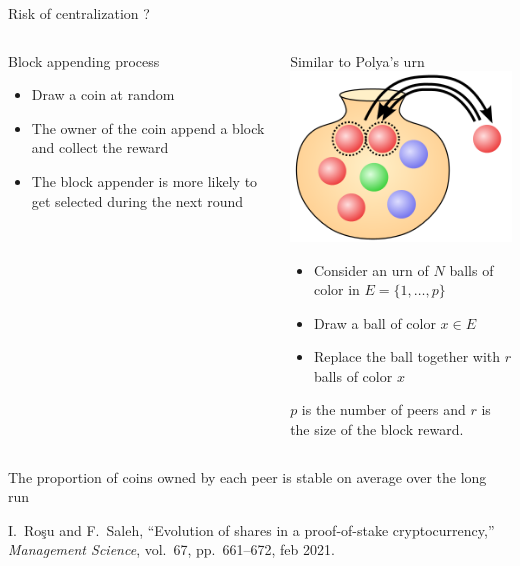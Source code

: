 \documentclass{beamer}
\begin{document}
\begin{frame}{Risk of centralization ?}
\scriptsize
\begin{columns}
\begin{column}{0.5\textwidth}
Block appending process
\begin{itemize}
  \item Draw a coin at random
  \item The owner of the coin append a block and collect the reward
  \item The block appender is more likely to get selected during the next round
\end{itemize}
\end{column}
\begin{column}{0.5\textwidth}
Similar to Polya's urn \includegraphics[scale=0.1]{../../Figures/poly_urn.png}
\begin{itemize}
  \item Consider an urn of $N$ balls of color in $E=\{1,\ldots, p\}$
  \item Draw a ball of color $x\in E$
  \item Replace the ball together with $r$ balls of color $x$ 
\end{itemize}
$p$ is the number of peers and $r$ is the size of the block reward. 
\end{column}
\end{columns}
\begin{tcolorbox}[enhanced,drop shadow, title=Theorem]
The proportion of coins owned by each peer is stable on average over the long run
\end{tcolorbox}

\tiny
\begin{thebibliography}{1}

I.~Ro{\c{s}}u and F.~Saleh, ``Evolution of shares in a proof-of-stake
  cryptocurrency,'' {\em Management Science}, vol.~67, pp.~661--672, feb 2021.
  \end{thebibliography}
\end{frame}
\end{document}
